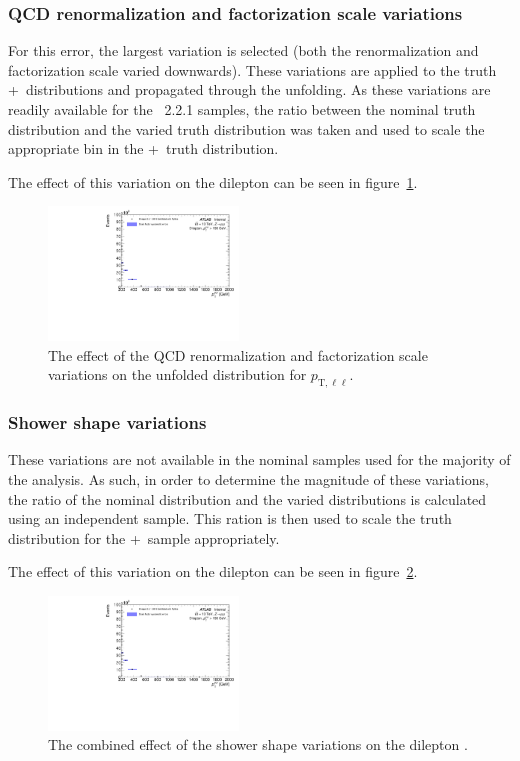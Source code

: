 \subsubsection{QCD renormalization and factorization scale variations}
For this error, the largest variation is selected (both the renormalization and factorization scale varied downwards). These variations are applied to the truth \powheg+\pythia~distributions and propagated through the unfolding. As these variations are readily available for the \sherpa~2.2.1 samples, the ratio between the nominal truth \sherpa distribution and the varied truth \sherpa distribution was taken and used to scale the appropriate bin in the \powheg+\pythia~truth distribution.

The effect of this variation on the dilepton \pt can be seen in figure~\ref{fig:qcdSystErr}.

\begin{figure}[h!]
  \centering
  \includegraphics[page=23,width=0.45\textwidth]{figures/unfoldErrPlots.pdf}
  \caption{The effect of the QCD renormalization and factorization scale variations on the unfolded distribution for $p_{\text{T},\ell\ell}$.}
  \label{fig:qcdSystErr}
\end{figure}

\subsubsection{Shower shape variations}
These variations are not available in the nominal samples used for the majority of the analysis. As such, in order to determine the magnitude of these variations, the ratio of the nominal distribution and the varied distributions is calculated using an independent sample. This ration is then used to scale the truth distribution for the \powheg+\pythia~sample appropriately.

The effect of this variation on the dilepton \pt can be seen in figure~\ref{fig:showerSystErr}.

\begin{figure}[h!]
  \centering
  \includegraphics[page=24,width=0.45\textwidth]{figures/unfoldErrPlots.pdf}
  \caption{The combined effect of the shower shape variations on the dilepton \pt.}
  \label{fig:showerSystErr}
\end{figure}

